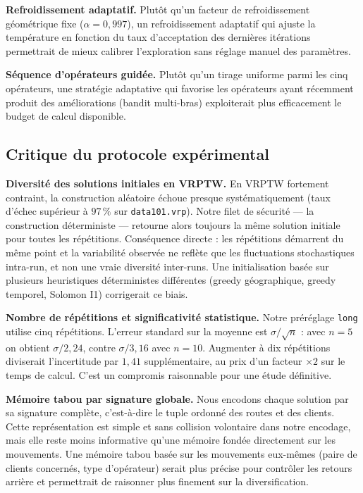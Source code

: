 \documentclass[11pt,a4paper]{article}
\begin{document}
\textbf{Refroidissement adaptatif.} Plutôt qu'un facteur de refroidissement géométrique fixe ($\alpha = 0{,}997$), un refroidissement adaptatif qui ajuste la température en fonction du taux d'acceptation des dernières itérations permettrait de mieux calibrer l'exploration sans réglage manuel des paramètres.

\textbf{Séquence d'opérateurs guidée.} Plutôt qu'un tirage uniforme parmi les cinq opérateurs, une stratégie adaptative qui favorise les opérateurs ayant récemment produit des améliorations (bandit multi-bras) exploiterait plus efficacement le budget de calcul disponible.

\subsection{Critique du protocole expérimental}

\textbf{Diversité des solutions initiales en VRPTW.} En VRPTW fortement contraint, la construction aléatoire échoue presque systématiquement (taux d'échec supérieur à $97\,\%$ sur \texttt{data101.vrp}). Notre filet de sécurité — la construction déterministe — retourne alors toujours la même solution initiale pour toutes les répétitions. Conséquence directe : les répétitions démarrent du même point et la variabilité observée ne reflète que les fluctuations stochastiques intra-run, et non une vraie diversité inter-runs. Une initialisation basée sur plusieurs heuristiques déterministes différentes (greedy géographique, greedy temporel, Solomon I1) corrigerait ce biais.

\textbf{Nombre de répétitions et significativité statistique.} Notre préréglage \texttt{long} utilise cinq répétitions. L'erreur standard sur la moyenne est $\sigma/\sqrt{n}$ : avec $n = 5$ on obtient $\sigma/2{,}24$, contre $\sigma/3{,}16$ avec $n = 10$. Augmenter à dix répétitions diviserait l'incertitude par $1{,}41$ supplémentaire, au prix d'un facteur $\times 2$ sur le temps de calcul. C'est un compromis raisonnable pour une étude définitive.

\textbf{Mémoire tabou par signature globale.} Nous encodons chaque solution par sa signature complète, c'est-à-dire le tuple ordonné des routes et des clients. Cette représentation est simple et sans collision volontaire dans notre encodage, mais elle reste moins informative qu'une mémoire fondée directement sur les mouvements. Une mémoire tabou basée sur les mouvements eux-mêmes (paire de clients concernés, type d'opérateur) serait plus précise pour contrôler les retours arrière et permettrait de raisonner plus finement sur la diversification.
\end{document}
